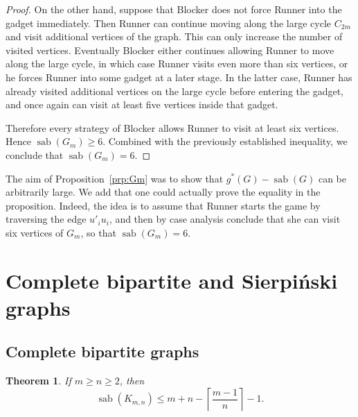 \documentclass[10pt,a4paper]{amsart}
\newtheorem{theorem}{Theorem}[section]
\DeclareMathOperator{\sab}{\mathrm{sab}}
\begin{document}
\begin{proof}
On the other hand, suppose that Blocker does not force Runner into the gadget immediately. Then Runner can continue moving along the large cycle $C_{2m}$ and visit additional vertices of the graph. This can only increase the number of visited vertices. Eventually Blocker either continues allowing Runner to move along the large cycle, in which case Runner visits even more than six vertices, or he forces Runner into some gadget at a later stage. In the latter case, Runner has already visited additional vertices on the large cycle before entering the gadget, and once again can visit at least five vertices inside that gadget.

Therefore every strategy of Blocker allows Runner to visit at least six vertices. Hence
$\sab(G_m)\ge 6$. Combined with the previously established inequality, we conclude that
$\sab(G_m)=6$.
\fi
\end{proof}

The aim of Proposition~\ref{prp:Gm} was to show that $g^\ast(G) - \sab(G)$ can be arbitrarily large. We add that one could actually prove the equality in the proposition. Indeed, the idea is to assume that Runner starts the game by traversing the edge $u'_iu_i$, and then by case analysis conclude that she can visit six vertices of $G_m$, so that $\sab(G_m) = 6$. 

\section{Complete bipartite and Sierpi\'nski graphs}
\label{sec:additional}

\subsection{Complete bipartite graphs}
\label{sec:complete-bipartite}

\begin{theorem}
\label{thm:complete_bipartite}
If $m \ge n \ge 2$, then
$$\sab(K_{m,n}) \leq m+n-\left\lceil \frac{m-1}{n} \right\rceil - 1.$$
\end{theorem}
\end{document}
